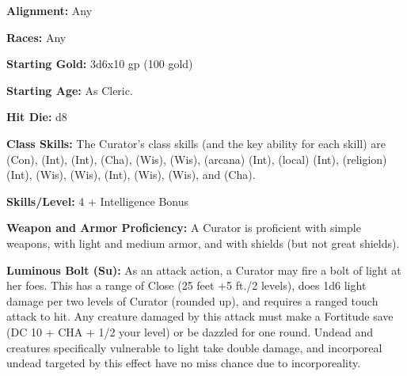 
\textbf{Alignment:} Any

\textbf{Races:} Any

\textbf{Starting Gold:} 3d6x10 gp (100 gold)

\textbf{Starting Age:} As Cleric.

\textbf{Hit Die:} d8

\textbf{Class Skills:} The Curator's class skills (and the key ability for each skill) are  (Con),  (Int),  (Int),  (Cha),  (Wis),  (Wis),  (arcana) (Int),  (local) (Int),  (religion) (Int),  (Wis),  (Wis),  (Int),  (Wis),  (Wis), and  (Cha).

\textbf{Skills/Level:} 4 + Intelligence Bonus

\modebab{}
\goodfor{}
\poorref{}
\goodwil{}

\begin{classtable}
\end{classtable}

\classfeatures

\textbf{Weapon and Armor Proficiency:} A Curator is proficient with simple weapons, with light and medium armor, and with shields (but not great shields).

\textbf{Luminous Bolt (Su):} As an attack action, a Curator may fire a bolt of light at her foes. This has a range of Close (25 feet +5 ft./2 levels), does 1d6 light damage per two levels of Curator (rounded up), and requires a ranged touch attack to hit. Any creature damaged by this attack must make a Fortitude save (DC 10 + CHA + 1/2 your level) or be dazzled for one round. Undead and creatures specifically vulnerable to light take double damage, and incorporeal undead targeted by this effect have no miss chance due to incorporeality.

